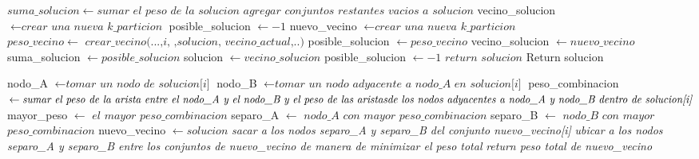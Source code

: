 \documentclass[a4paper]{article}
\begin{document}
\vspace{0.4cm}
\begin{algorithmic}[1]
        \State $suma\_solucion \gets \textit{sumar el peso de la solucion}$
        		\State $ \textit{agregar conjuntos restantes vacios a solucion} $
        \EndIf
        \State vecino\_solucion $\gets \textit{crear una nueva k\_particion}$     
        \State posible\_solucion $\gets -1$
					\State nuevo\_vecino $\gets \textit{crear una nueva k\_particion}$                              
                		\State $peso\_vecino \gets \textit{ crear\_vecino(...,i, ,solucion, vecino\_actual,..)} $ 
                \EndIf
                		\State posible\_solucion $\gets peso\_vecino$
                		\State vecino\_solucion $\gets nuevo\_vecino$
                \EndIf     
			\EndFor   
				\State suma\_solucion $ \gets posible\_solucion$
				\State solucion $ \gets vecino\_solucion$
				\State posible\_solucion $\gets -1$
			\Else
				\State $return$ $solucion$
			\EndIf   
        \EndWhile            
        \State Return solucion
\EndProcedure
\end{algorithmic}

\vspace{0.4cm}
\begin{algorithmic}[1]
				\State nodo\_A $\gets \textit{tomar un nodo de solucion[i]}$ 
				\State nodo\_B $\gets \textit{tomar un nodo adyacente a nodo\_A en solucion[i]} $              
                \State peso\_combinacion $\gets \textit{sumar el peso de la arista entre el nodo\_A y el nodo\_B y el peso de las aristas}  \newline \textit{de los nodos adyacentes a nodo\_A y nodo\_B dentro de solucion[i]}$
			    \State mayor\_peso $\gets$ $el$ $mayor$ $peso\_combinacion $
			    \State separo\_A $\gets$ $nodo\_A$ $con$ $mayor$ $peso\_combinacion$
			    \State separo\_B $\gets$ $nodo\_B$ $con$ $mayor$ $peso\_combinacion$     
		\EndFor	         
         \State nuevo\_vecino  $\gets solucion$ 
         \State \textit{sacar a los nodos separo\_A y separo\_B del conjunto nuevo\_vecino[i]}   
         \State \textit{ubicar a los nodos separo\_A y separo\_B entre los conjuntos de nuevo\_vecino de manera de minimizar el peso total} 
         \State \textit{return peso total de nuevo\_vecino}
\EndProcedure
\end{algorithmic}
\vspace{0.4cm}
\end{document}
